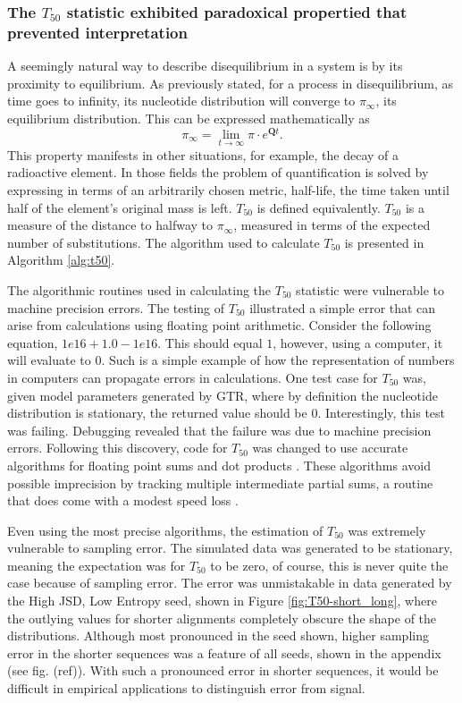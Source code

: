 

\subsubsection*{The $T_{50}$ statistic exhibited paradoxical propertied that prevented interpretation}

A seemingly natural way to describe disequilibrium in a system is by its proximity to equilibrium. As previously stated, for a process in disequilibrium, as time goes to infinity, its nucleotide distribution will converge to $\pi_\infty$, its equilibrium distribution. This can be expressed mathematically as 
$$\pi_\infty = \lim_{t \to \infty}\pi \cdot e^{\mathbf{Q}t}.$$ 
This property manifests in other situations, for example, the decay of a radioactive element. In those fields the problem of quantification is solved by expressing in terms of an arbitrarily chosen metric, half-life, the time taken until half of the element's original mass is left. $T_{50}$ is defined equivalently. ${T_{50}}$ is a measure of the distance to halfway to $\pi_\infty$, measured in terms of the expected number of substitutions. The algorithm used to calculate $T_{50}$ is presented in Algorithm \ref{alg:t50}.



The algorithmic routines used in calculating the $T_{50}$ statistic were vulnerable to machine precision errors. The testing of $T_{50}$ illustrated a simple error that can arise from calculations using \gls{floating point arithmetic}. Consider the following equation, $1e16 + 1.0 - 1e16$. This should equal $1$, however, using a computer, it will evaluate to $0$. Such is a simple example of how the representation of numbers in computers can propagate errors in calculations. One test case for $T_{50}$ was, given model parameters generated by GTR, where by definition the nucleotide distribution is stationary, the returned value should be $0$. Interestingly, this test was failing. Debugging revealed that the failure was due to machine precision errors. Following this discovery, code for $T_{50}$ was changed to use accurate algorithms for floating point sums and dot products \citep{accupy}. These algorithms avoid possible imprecision by tracking multiple intermediate partial sums, a routine that does come with a modest speed loss \citep{Shewchuk1997AdaptivePredicates, Ogita2005AccurateProduct}. 

Even using the most precise algorithms, the estimation of $T_{50}$ was extremely vulnerable to sampling error. The simulated data was generated to be stationary, meaning the expectation was for $T_{50}$ to be zero, of course, this is never quite the case because of sampling error. The error was unmistakable in data generated by the High JSD, Low Entropy seed, shown in Figure \ref{fig:T50-short_long}, where the outlying values for shorter alignments completely obscure the shape of the distributions. Although most pronounced in the seed shown, higher sampling error in the shorter sequences was a feature of all seeds, shown in the appendix (see fig. (ref)). With such a pronounced error in shorter sequences, it would be difficult in empirical applications to distinguish error from signal. 


